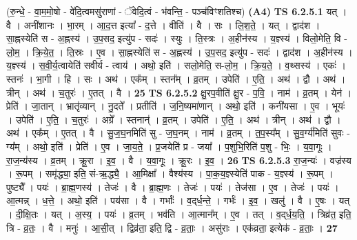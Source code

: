 \documentclass[17pt]{extarticle}
\begin{document}
                  \newline
                      (रु॒न्धे॒ - वा॒म॒मो॒षो - वे॑दि॒त्वमसु॑राणां - ॅवेदि॒त्वं - भ॑वन्ति॒ - पञ्च॑विꣳशतिश्च)  \textbf{(A4)} \newline \newline
                                \textbf{ TS 6.2.5.1} \newline
                  यत् । वै । अनी॑शानः । भा॒रम् । आ॒द॒त्त इत्या᳚ - द॒त्ते । वीति॑ । वै । सः । लि॒श॒ते॒ । यत् । द्वाद॑श । सा॒ह्नस्येति॑ स - अ॒ह्नस्य॑ । उ॒प॒सद॒ इत्यु॑प - सदः॑ । स्युः । ति॒स्त्रः । अ॒हीन॑स्य । य॒ज्ञ्स्य॑ । विलो॒मेति॒ वि - लो॒म॒ । क्रि॒ये॒त॒ । ति॒स्रः । ए॒व । सा॒ह्नस्येति॑ स - अ॒ह्नस्य॑ । उ॒प॒सद॒ इत्यु॑प - सदः॑ । द्वाद॑श । अ॒हीन॑स्य । य॒ज्ञ्स्य॑ । स॒वी॒र्य॒त्वायेति॑ सवीर्य - त्वाय॑ । अथो॒ इति॑ । सलो॒मेति॒ स-लो॒म॒ । क्रि॒य॒ते॒ । व॒थ्सस्य॑ । एकः॑ । स्तनः॑ । भा॒गी । हि । सः । अथ॑ । एक᳚म् । स्तन᳚म् । व्र॒तम् । उपेति॑ । ए॒ति॒ । अथ॑ । द्वौ । अथ॑ । त्रीन् । अथ॑ । च॒तुरः॑ । ए॒तत् । वै । \textbf{  25} \newline
                  \newline
                                \textbf{ TS 6.2.5.2} \newline
                  क्षु॒रप॒वीति॑ क्षु॒र - प॒वि॒ । नाम॑ । व्र॒तम् । येन॑ । प्रेति॑ । जा॒तान् । भ्रातृ॑व्यान् । नु॒दते᳚ । प्रतीति॑ । ज॒नि॒ष्यमा॑णान् । अथो॒ इति॑ । कनी॑यसा । ए॒व । भूयः॑ । उपेति॑ । ए॒ति॒ । च॒तुरः॑ । अग्रे᳚ । स्तनान्॑ । व्र॒तम् । उपेति॑ । ए॒ति॒ । अथ॑ । त्रीन् । अथ॑ । द्वौ । अथ॑ । एक᳚म् । ए॒तत् । वै । सु॒ज॒घ॒नमिति॑ सु - ज॒घ॒नम् । नाम॑ । व्र॒तम् । त॒प॒स्य᳚म् । सु॒व॒र्ग्य॑मिति॑ सुवः - ग्य᳚म् । अथो॒ इति॑ । प्रेति॑ । ए॒व । जा॒य॒ते॒ । प्र॒जयेति॑ प्र - जया᳚ । प॒शुभि॒रिति॑ प॒शु - भिः॒ । य॒वा॒गूः । रा॒ज॒न्य॑स्य । व्र॒तम् । क्रू॒रा । इ॒व॒ । वै । य॒वा॒गूः । क्रू॒रः । इ॒व॒ । \textbf{  26} \newline
                  \newline
                                \textbf{ TS 6.2.5.3} \newline
                  रा॒ज॒न्यः॑ । वज्र॑स्य । रू॒पम् । समृ॑द्ध्या॒ इति॒ सं-ऋ॒द्ध्यै॒ । आ॒मिक्षा᳚ । वैश्य॑स्य । पा॒क॒य॒ज्ञ्स्येति॑ पाक - य॒ज्ञ्स्य॑ । रू॒पम् । पुष्ट्यै᳚ । पयः॑ । ब्रा॒ह्म॒णस्य॑ । तेजः॑ । वै । ब्रा॒ह्म॒णः । तेजः॑ । पयः॑ । तेज॑सा । ए॒व । तेजः॑ । पयः॑ । आ॒त्मन्न् । ध॒त्ते॒ । अथो॒ इति॑ । पय॑सा । वै । गर्भाः᳚ । व॒द्‌र्ध॒न्ते॒ । गर्भः॑ । इ॒व॒ । खलु॑ । वै । ए॒षः । यत् । दी॒क्षि॒तः । यत् । अ॒स्य॒ । पयः॑ । व्र॒तम् । भव॑ति । आ॒त्मान᳚म् । ए॒व । तत् । व॒द्‌र्ध॒य॒ति॒ । त्रिव्र॑त॒ इति॒ त्रि - व्र॒तः॒ । वै । मनुः॑ । आ॒सी॒त् । द्विव्र॑ता॒ इति॒ द्वि - व्र॒ताः॒ । असु॑राः । एक॑व्रता॒ इत्येक॑ - व्र॒ताः॒ । \textbf{  27} \newline
\end{document}
